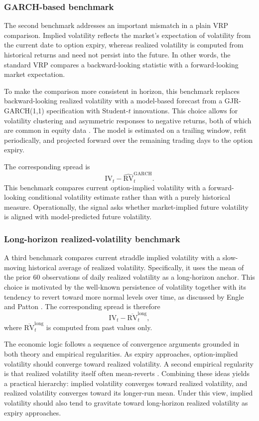﻿\documentclass{article}
\begin{document}
\subsubsection{GARCH-based benchmark}

The second benchmark addresses an important mismatch in a plain VRP comparison. Implied volatility reflects the market's expectation of volatility from the current date to option expiry, whereas realized volatility is computed from historical returns and need not persist into the future. In other words, the standard VRP compares a backward-looking statistic with a forward-looking market expectation.

To make the comparison more consistent in horizon, this benchmark replaces backward-looking realized volatility with a model-based forecast from a GJR-GARCH(1,1) specification with Student-$t$ innovations. This choice allows for volatility clustering and asymmetric responses to negative returns, both of which are common in equity data \cite{glosten1993}. The model is estimated on a trailing window, refit periodically, and projected forward over the remaining trading days to the option expiry.

The corresponding spread is
\[
\mathrm{IV}_t-\widehat{\mathrm{RV}}^{\mathrm{GARCH}}_t.
\]
This benchmark compares current option-implied volatility with a forward-looking conditional volatility estimate rather than with a purely historical measure. Operationally, the signal asks whether market-implied future volatility is aligned with model-predicted future volatility.

\subsubsection{Long-horizon realized-volatility benchmark}

A third benchmark compares current straddle implied volatility with a slow-moving historical average of realized volatility. Specifically, it uses the mean of the prior 60 observations of daily realized volatility as a long-horizon anchor. This choice is motivated by the well-known persistence of volatility together with its tendency to revert toward more normal levels over time, as discussed by Engle and Patton \cite{englepatton2001}. The corresponding spread is therefore
\[
\mathrm{IV}_t-\overline{\mathrm{RV}}^{\mathrm{long}}_t,
\]
where $\overline{\mathrm{RV}}^{\mathrm{long}}_t$ is computed from past values only.

The economic logic follows a sequence of convergence arguments grounded in both theory and empirical regularities. As expiry approaches, option-implied volatility should converge toward realized volatility. A second empirical regularity is that realized volatility itself often mean-reverts \cite{marshall2009,englepatton2001}. Combining these ideas yields a practical hierarchy: implied volatility converges toward realized volatility, and realized volatility converges toward its longer-run mean. Under this view, implied volatility should also tend to gravitate toward long-horizon realized volatility as expiry approaches.
\end{document}
